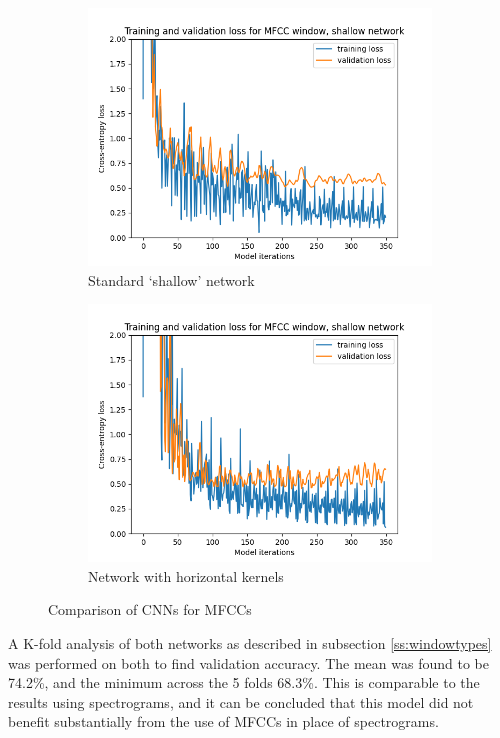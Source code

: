 \documentclass[class=report,11pt,crop=false]{standalone}
\begin{document}
\begin{figure}[ht]
    \begin{subfigure}[b]{0.5\textwidth}
        \includegraphics[width=\linewidth]{Images/mfccSimple.png}
        \caption{Standard `shallow' network}
        \label{fig:mfccshallow}
    \end{subfigure}
    \hfill
    \begin{subfigure}[b]{0.5\textwidth}
        \includegraphics[width=\linewidth]{Images/mfccCustom.png}
        \caption{Network with horizontal kernels}
        \label{fig:mfcccustom}
    \end{subfigure}
    \hfill
    \caption{Comparison of CNNs for MFCCs}
    \label{fig:mfcc}
\end{figure}

A K-fold analysis of both networks as described in subsection \ref{ss:windowtypes} was performed on both to find validation accuracy. The mean was found to be 74.2\%, and the minimum across the 5 folds 68.3\%. This is comparable to the results using spectrograms, and it can be concluded that this model did not benefit substantially from the use of MFCCs in place of spectrograms.


\ifstandalone

\printnoidxglossary[type=\acronymtype,nonumberlist]
\fi
\end{document}
